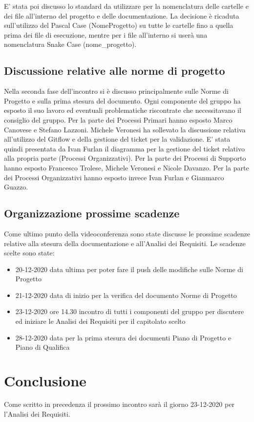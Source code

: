 E' stata poi discusso lo standard da utilizzare per la nomenclatura delle cartelle e dei file all'interno del progetto e delle documentazione. La decisione è ricaduta sull'utilizzo del Pascal Case (NomeProgetto) su tutte le cartelle fino a quella prima dei file di esecuzione, mentre per i file all'interno si userà una nomenclatura Snake Case (nome\_progetto).

\subsection{Discussione relative alle norme di progetto}
Nella seconda fase dell'incontro si è discusso principalmente sulle Norme di Progetto e sulla prima stesura del documento. Ogni componente del gruppo ha esposto il suo lavoro ed eventuali problematiche riscontrate che necessitavano il consiglio del gruppo. Per la parte dei Processi Primari hanno esposto Marco Canovese e Stefano Lazzoni. Michele Veronesi ha sollevato la discussione relativa all'utilizzo del Gitflow e della gestione del ticket per la validazione. E' stata quindi presentata da Ivan Furlan il diagramma per la gestione del ticket relativo alla propria parte (Processi Organizzativi). Per la parte dei Processi di Supporto hanno esposto Francesco Trolese, Michele Veronesi e Nicole Davanzo. Per la parte dei Processi Organizzativi hanno esposto invece Ivan Furlan e Gianmarco Guazzo.

\subsection{Organizzazione prossime scadenze}
Come ultimo punto della videoconferenza sono state discusse le prossime scadenze relative alla stesura della documentazione e all'Analisi dei Requisiti. Le scadenze scelte sono state:
\begin{itemize}
	\item 20-12-2020 data ultima per poter fare il push delle modifiche sulle Norme di Progetto
	\item 21-12-2020 data di inizio per la verifica del documento Norme di Progetto 
	\item 23-12-2020 ore 14.30 incontro di tutti i componenti del gruppo per discutere ed iniziare le Analisi dei Requisiti per il capitolato scelto
	\item 28-12-2020 data per la prima stesura dei documenti Piano di Progetto e Piano di Qualifica
\end{itemize}

\section{Conclusione}
Come scritto in precedenza il prossimo incontro sarà il giorno 23-12-2020 per l'Analisi dei Requisiti.

